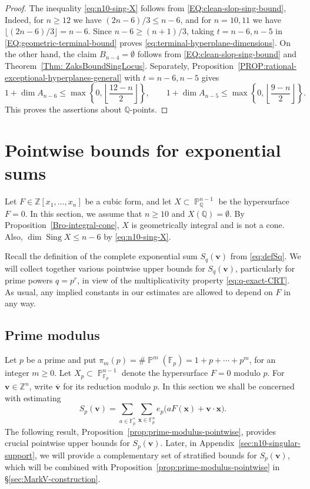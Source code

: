 \documentclass[a4paper,11pt, twoside,reqno]{amsart}
\theoremstyle{plain}
\theoremstyle{definition}
\theoremstyle{remark}
\newcommand{\bfv}{\bm{v}}
\newcommand{\bfx}{\bm{x}}
\newcommand{\ZZ}{\mathbb{Z}}
\newcommand{\QQ}{\mathbb{Q}}
\DeclareMathOperator{\sing}{Sing}
\DeclareMathOperator{\PP}{\mathbb{P}}
\renewcommand{\bar}{\overline}
\renewcommand{\le}{\leqslant}
\renewcommand{\ge}{\geqslant}
\renewcommand{\geq}{\geqslant}
\newcommand{\FF}{\mathbb{F}}
\numberwithin{equation}{section}
\begin{document}
\begin{proof}
The inequality \eqref{eq:n10-sing-X} follows from \eqref{EQ:clean-slop-sing-bound},
Indeed, for $n\ge 12$ we have $(2n-6)/3 \le n-6$,
and for $n=10,11$ we have $\lfloor(2n-6)/3\rfloor = n-6$.
Since $n-6\ge(n+1)/3$,
taking $t=n-6,n-5$ in \eqref{EQ:geometric-terminal-bound} proves
\eqref{eq:terminal-hyperplane-dimensions}.
On the other hand,
the claim $B_{n-4} = \emptyset$ follows from \eqref{EQ:clean-slop-sing-bound}
and Theorem~\ref{Thm: ZaksBoundSingLocus}.
Separately,
Proposition~\ref{PROP:rational-exceptional-hyperplanes-general}
with $t=n-6,n-5$ gives
\[
1+\dim A_{n-6}
\le \max\left\{0,\left\lfloor\frac{12-n}{2}\right\rfloor\right\},
\qquad
1+\dim A_{n-5}
\le \max\left\{0,\left\lfloor\frac{9-n}{2}\right\rfloor\right\}.
\]
This proves the assertions about $\QQ$-points.
\end{proof}

\section{Pointwise bounds for  exponential sums}
\label{sec:pointwise}

Let $F\in \ZZ[x_1,\dots,x_n]$ be a cubic form,
and let $X \subset \PP^{n-1}_\QQ$ be the hypersurface $F=0$.
In this section, we assume that $n\geq 10$ and $X(\QQ)=\emptyset$.
By Proposition~\ref{Bro-integral-cone},
$X$ is geometrically integral and is not a cone.
Also, $\dim\sing X \le n-6$ by \eqref{eq:n10-sing-X}.

Recall the definition of the complete exponential sum $S_q(\bfv)$ from \eqref{eq:defSq}.
We will collect together various pointwise upper bounds for $S_q(\bfv)$,
particularly for prime powers $q=p^r$, in view of the multiplicativity property 
\eqref{eq:q-exact-CRT}.
As usual, any implied constants in our estimates are allowed to depend on $F$ in any way.

\subsection{Prime modulus}

Let $p$ be a prime and put 
$\pi_m(p)=\#\PP^m(\FF_p)=1+p+\cdots+p^m$,
for an integer $m\geq 0$.
Let $X_p\subset \PP^{n-1}_{\FF_p}$
denote the hypersurface $F=0$ modulo $p$.  For $\bfv\in\ZZ^n$, write
$\bar{\bfv}$ for its reduction modulo $p$. In this section we shall be concerned with estimating 
\[
S_p(\bfv)
=\sum_{a\in\FF_p^\ast}\sum_{\bfx\in\FF_p^n}
e_p\bigl(aF(\bfx)+\bfv\cdot\bfx\bigr).
\]
The following result, Proposition~\ref{prop:prime-modulus-pointwise},
provides crucial pointwise upper bounds for $S_p(\bfv)$.
Later, in Appendix~\ref{sec:n10-singular-support},
we will provide a complementary set of
stratified bounds for $S_p(\bfv)$,
which will be combined with Proposition~\ref{prop:prime-modulus-pointwise}
in \S\ref{sec:MarkV-construction}.
\end{document}
